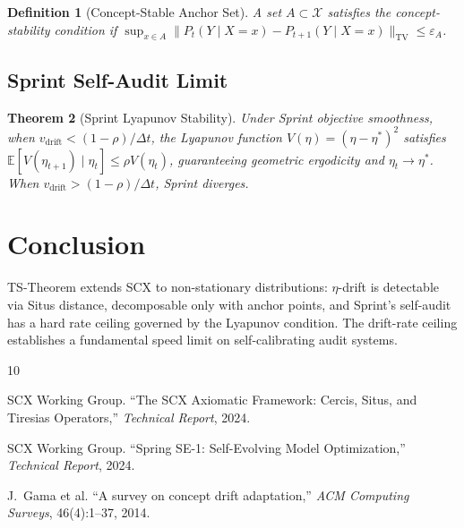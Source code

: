 \documentclass[12pt,a4paper]{article}
\newtheorem{theorem}{Theorem}[section]
\newtheorem{definition}[theorem]{Definition}
\newcommand{\E}{\mathbb{E}}
\newcommand{\cX}{\mathcal{X}}
\newcommand{\TV}{\mathrm{TV}}
\begin{document}
\begin{definition}[Concept-Stable Anchor Set]
\label{def:anchor}
A set $A \subset \cX$ satisfies the concept-stability condition if $\sup_{x \in A} \|P_t(Y\mid X=x) - P_{t+1}(Y\mid X=x)\|_{\TV} \leq \varepsilon_A$.
\end{definition}

\subsection{Sprint Self-Audit Limit}

\begin{theorem}[Sprint Lyapunov Stability]
\label{thm:sprint-limit}
Under Sprint objective smoothness, when $v_{\mathrm{drift}} < (1-\rho)/\Delta t$, the Lyapunov function $V(\eta) = (\eta - \eta^*)^2$ satisfies $\E[V(\eta_{t+1}) \mid \eta_t] \leq \rho V(\eta_t)$, guaranteeing geometric ergodicity and $\eta_t \to \eta^*$. When $v_{\mathrm{drift}} > (1-\rho)/\Delta t$, Sprint diverges.
\end{theorem}

\section{Conclusion}

TS-Theorem extends \textsf{SCX} to non-stationary distributions: $\eta$-drift is detectable via Situs distance, decomposable only with anchor points, and Sprint's self-audit has a hard rate ceiling governed by the Lyapunov condition. The drift-rate ceiling establishes a fundamental speed limit on self-calibrating audit systems.


\begin{thebibliography}{10}

SCX Working Group.
\newblock ``The \textsf{SCX} Axiomatic Framework: Cercis, Situs, and Tiresias Operators,''
\newblock \emph{Technical Report}, 2024.

SCX Working Group.
\newblock ``Spring SE-1: Self-Evolving Model Optimization,''
\newblock \emph{Technical Report}, 2024.

J.~Gama et al.
\newblock ``A survey on concept drift adaptation,''
\newblock \emph{ACM Computing Surveys}, 46(4):1--37, 2014.

\end{thebibliography}
\end{document}
